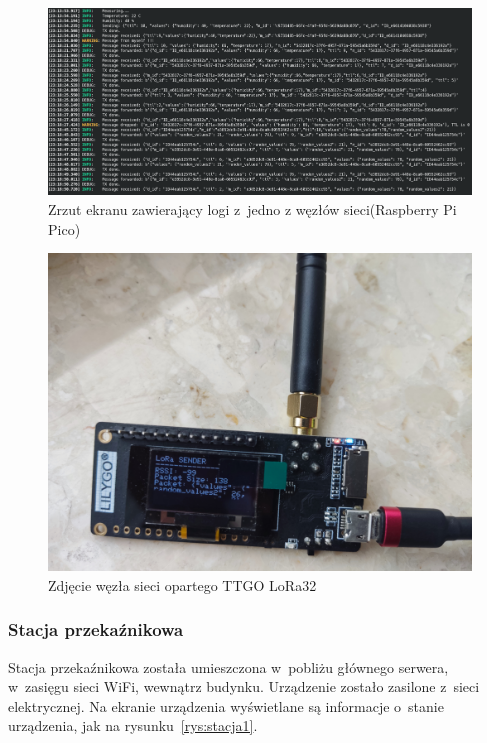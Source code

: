 \begin{figure}[b!]
    \begin{center}
        \includegraphics[width=13cm]{pic/logi-pico.png}
    \end{center}
    \caption{Zrzut ekranu zawierający logi z~jedno z węzłów sieci(Raspberry Pi Pico)}\label{rys:logi-pico}
\end{figure}

\begin{figure}[b!]
    \begin{center}
        \includegraphics[width=13cm]{pic/wezel2.jpg}
    \end{center}
    \caption{Zdjęcie węzła sieci opartego TTGO LoRa32}\label{rys:wezel2}
\end{figure}

\subsubsection{Stacja przekaźnikowa}
Stacja przekaźnikowa została umieszczona w~pobliżu głównego serwera, w~zasięgu sieci WiFi, wewnątrz budynku.
Urządzenie zostało zasilone z~sieci elektrycznej.
Na ekranie urządzenia wyświetlane są informacje o~stanie urządzenia, jak na rysunku~\ref{rys:stacja1}.

